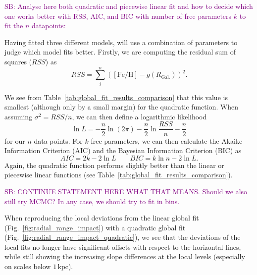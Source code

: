 \documentclass[fleqn,usenatbib]{mnras}
\newcommand{\SB}[1]{{\textcolor{purple}{SB: #1}}}
\begin{document}
\SB{Analyse here both quadratic and piecewise linear fit and how to decide which one works better with RSS, AIC, and BIC with number of free parameters $k$ to fit the $n$ datapoints:}

Having fitted three different models, will use a combination of parameters to judge which model fits better. Firstly, we are computing the residual sum of squares ($RSS$) as 
\begin{equation} \label{eq:rss}
    RSS = \sum_i^n \left( \mathrm{[Fe/H]} - g(R_\mathrm{Gal.}) \right)^2.
\end{equation}



We see from Table~\ref{tab:global_fit_results_comparison} that this value is smallest (although only by a small margin) for the quadratic function. When assuming $\sigma^2 = RSS / n$, we can then define a logarithmic likelihood
\begin{equation}
    \ln L = - \frac{n}{2} \ln (2 \pi) - \frac{n}{2} \ln \frac{RSS}{n} - \frac{n}{2}
\end{equation}
for our $n$ data points. For $k$ free parameters, we can then calculate the Akaike Information Criterion (AIC) and the Bayesian Information Criterion (BIC) as
\begin{equation} \label{eq:aic_bic}
    AIC = 2 k  - 2 \ln L \qquad BIC = k \ln n - 2 \ln L.
\end{equation}
Again, the quadratic function performs slightly better than the linear or piecewise linear functions (see Table~\ref{tab:global_fit_results_comparison}).

\SB{CONTINUE STATEMENT HERE WHAT THAT MEANS. Should we also still try MCMC? In any case, we should try to fit in bins.}

When reproducing the local deviations from the linear global fit (Fig.~\ref{fig:radial_range_impact}) with a quadratic global fit (Fig.~\ref{fig:radial_range_impact_quadratic}), we see that the deviations of the local fits no longer have significant offsets with respect to the horizontal lines, while still showing the increasing slope differences at the local levels (especially on scales below $1\,\mathrm{kpc}$). 
\end{document}
